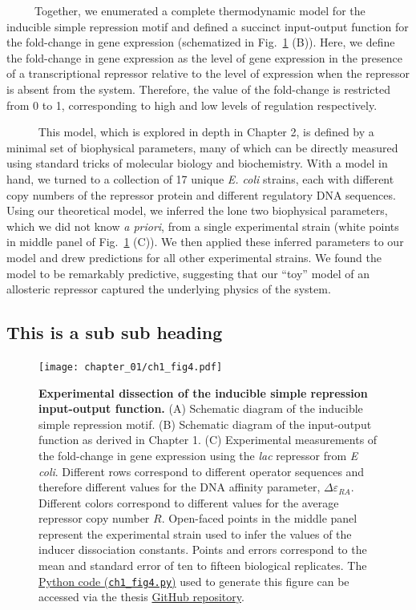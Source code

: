 \documentclass[12pt]{caltech_thesis}
\begin{document}
~~~~~Together, we enumerated a complete thermodynamic model for the
inducible simple repression motif and defined a succinct input-output
function for the fold-change in gene expression (schematized in
Fig.~\ref{fig:induction_intro} (B)). Here, we define the fold-change in
gene expression as the level of gene expression in the presence of a
transcriptional repressor relative to the level of expression when the
repressor is absent from the system. Therefore, the value of the
fold-change is restricted from 0 to 1, corresponding to high and low
levels of regulation respectively.

~~~~~ This model, which is explored in depth in Chapter 2, is defined by
a minimal set of biophysical parameters, many of which can be directly
measured using standard tricks of molecular biology and biochemistry.
With a model in hand, we turned to a collection of 17 unique \emph{E.
coli} strains, each with different copy numbers of the repressor protein
and different regulatory DNA sequences. Using our theoretical model, we
inferred the lone two biophysical parameters, which we did not know
\emph{a priori}, from a single experimental strain (white points in
middle panel of Fig.~\ref{fig:induction_intro} (C)). We then applied
these inferred parameters to our model and drew predictions for all
other experimental strains. We found the model to be remarkably
predictive, suggesting that our ``toy'' model of an allosteric repressor
captured the underlying physics of the system.

\hypertarget{this-is-a-sub-sub-heading}{%
\subsection{This is a sub sub heading}\label{this-is-a-sub-sub-heading}}

\hypertarget{fig:induction_intro}{%
\begin{figure}
\centering
\texttt{[image: chapter\_01/ch1\_fig4.pdf]}
\caption[{Experimental dissection of the inducible simple repression
input-output function.}]{\textbf{Experimental dissection of the
inducible simple repression input-output function.} (A) Schematic
diagram of the inducible simple repression motif. (B) Schematic diagram
of the input-output function as derived in Chapter 1. (C) Experimental
measurements of the fold-change in gene expression using the \emph{lac}
repressor from \emph{E coli}. Different rows correspond to different
operator sequences and therefore different values for the DNA affinity
parameter, \(\Delta\varepsilon_{RA}\). Different colors correspond to
different values for the average repressor copy number \(R\). Open-faced
points in the middle panel represent the experimental strain used to
infer the values of the inducer dissociation constants. Points and
errors correspond to the mean and standard error of ten to fifteen
biological replicates. The
\href{https://github.com/gchure/phd/blob/master/src/chapter_01/code/ch1_fig4.py}{Python
code (\texttt{ch1\_fig4.py})} used to generate this figure can be
accessed via the thesis \href{https://github.com/gchure/phd}{GitHub
repository}.}
\label{fig:induction_intro}
\end{figure}
}
\end{document}
